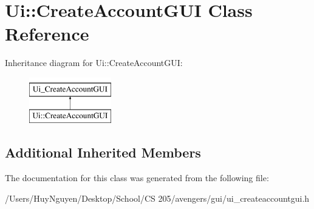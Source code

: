\hypertarget{classUi_1_1CreateAccountGUI}{}\section{Ui\+:\+:Create\+Account\+G\+UI Class Reference}
\label{classUi_1_1CreateAccountGUI}
Inheritance diagram for Ui\+:\+:Create\+Account\+G\+UI\+:\begin{figure}[H]
\begin{center}
\leavevmode
\includegraphics[height=2.000000cm]{classUi_1_1CreateAccountGUI}
\end{center}
\end{figure}
\subsection*{Additional Inherited Members}


The documentation for this class was generated from the following file\+:\begin{DoxyCompactItemize}
\item 
/\+Users/\+Huy\+Nguyen/\+Desktop/\+School/\+C\+S 205/avengers/gui/ui\+\_\+createaccountgui.\+h\end{DoxyCompactItemize}
